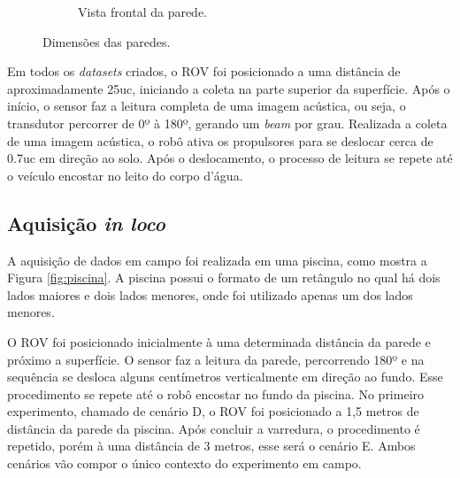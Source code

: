 \begin{figure}[H]
\begin{subfigure}[t]{0.328\textwidth}
        \caption{Vista frontal da parede.}
        \label{fig:dim_frontal}
    \end{subfigure}
    \caption{Dimensões das paredes.}
    \label{fig:dimensoes}
\end{figure}

Em todos os \textit{datasets} criados, o ROV foi posicionado a uma distância de aproximadamente 25uc, iniciando a coleta na parte superior da superfície. 
Após o início, o sensor faz a leitura completa de uma imagem acústica, ou seja, o transdutor percorrer de 0º à  180º, gerando um \textit{beam} por grau.
Realizada a coleta de uma imagem acústica, o robô ativa os propulsores para se deslocar cerca de 0.7uc em direção ao solo. 
Após o deslocamento, o processo de leitura se repete até o veículo encostar no leito do corpo d'água.


\subsection{Aquisição \textit{in loco}}
\label{sec:in_loco}

A aquisição de dados em campo foi realizada em uma piscina, como mostra a Figura \ref{fig:piscina}.
A piscina possui o formato de um retângulo no qual há dois lados maiores e dois lados menores, onde foi utilizado apenas um dos lados menores.

O ROV foi posicionado inicialmente à uma determinada distância da parede e próximo a superfície.
O sensor faz a leitura da parede, percorrendo 180º e na sequência se desloca alguns centímetros verticalmente em direção ao fundo.
Esse procedimento se repete até o robô encostar no fundo da piscina.
No primeiro experimento, chamado de cenário D, o ROV foi posicionado a 1,5 metros de distância da parede da piscina.
Após concluir a varredura, o procedimento é repetido, porém à uma distância de 3 metros, esse será o cenário E. 
Ambos cenários vão compor o único contexto do experimento em campo.

